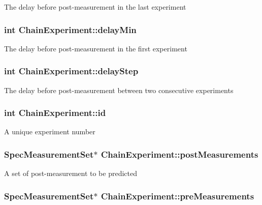 The delay before post-\/measurement in the last experiment \hypertarget{class_chain_experiment_a06dd6bc7fbeeb3d6a0f506e7e239240c}{
\subsubsection[{delay\-Min}]{\setlength{\rightskip}{0pt plus 5cm}int Chain\-Experiment\-::delay\-Min}}\label{class_chain_experiment_a06dd6bc7fbeeb3d6a0f506e7e239240c}
The delay before post-\/measurement in the first experiment \hypertarget{class_chain_experiment_ada234ba1f0da4c9f2828ac759d1c7c4f}{
\subsubsection[{delay\-Step}]{\setlength{\rightskip}{0pt plus 5cm}int Chain\-Experiment\-::delay\-Step}}\label{class_chain_experiment_ada234ba1f0da4c9f2828ac759d1c7c4f}
The delay before post-\/measurement between two consecutive experiments \hypertarget{class_chain_experiment_ab197887e94e2586b3ba274bef7211c8c}{
\subsubsection[{id}]{\setlength{\rightskip}{0pt plus 5cm}int Chain\-Experiment\-::id}}\label{class_chain_experiment_ab197887e94e2586b3ba274bef7211c8c}
A unique experiment number \hypertarget{class_chain_experiment_a9362d54e02df4c8dd2a461b7aa4e322a}{
\subsubsection[{post\-Measurements}]{\setlength{\rightskip}{0pt plus 5cm}Spec\-Measurement\-Set$\ast$ Chain\-Experiment\-::post\-Measurements}}\label{class_chain_experiment_a9362d54e02df4c8dd2a461b7aa4e322a}
A set of post-\/measurement to be predicted \hypertarget{class_chain_experiment_adbc54d1d7cd2d86f838b0128e5597216}{
\subsubsection[{pre\-Measurements}]{\setlength{\rightskip}{0pt plus 5cm}Spec\-Measurement\-Set$\ast$ Chain\-Experiment\-::pre\-Measurements}}\label{class_chain_experiment_adbc54d1d7cd2d86f838b0128e5597216}
